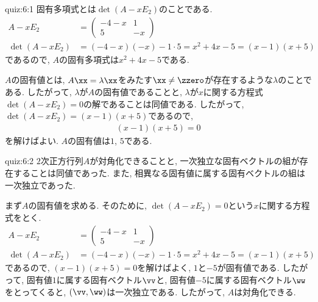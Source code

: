 \begin{answerof}{quiz:6:1}
固有多項式とは$\det(A-xE_2)$のことである.
  \begin{align*}
    A-xE_2&=\begin{pmatrix}-4-x&1\\5&-x\end{pmatrix}\\
    \det(A-xE_2)&=(-4-x)(-x)-1\cdot 5=x^2+4x-5=(x-1)(x+5)
  \end{align*}
  であるので, $A$の固有多項式は$x^2+4x-5$である.

  $A$の固有値とは, $A\xx=\lambda\xx$をみたす$\xx\neq\zzero$が存在するような$\lambda$のことである.
  したがって, $\lambda$が$A$の固有値であることと, 
  $\lambda$が$x$に関する方程式$\det(A-xE_2)=0$の解であることは同値である.
  したがって, $\det(A-xE_2)=(x-1)(x+5)$であるので,
  \begin{align*}
    (x-1)(x+5)=0
  \end{align*}
  を解けばよい.  $A$の固有値は$1$, $5$である.  
\end{answerof}


\begin{answerof}{quiz:6:2}
  $2$次正方行列$A$が対角化できることと,
  一次独立な固有ベクトルの組が存在することは同値であった.
  また, 相異なる固有値に属する固有ベクトルの組は一次独立であった.
  
  まず$A$の固有値を求める.
  そのために, $\det(A-xE_2)=0$という$x$に関する方程式をとく.
  \begin{align*}
    A-xE_2&=\begin{pmatrix}-4-x&1\\5&-x\end{pmatrix}\\
    \det(A-xE_2)&=(-4-x)(-x)-1\cdot 5=x^2+4x-5=(x-1)(x+5)
  \end{align*}
  であるので, $(x-1)(x+5)=0$を解けばよく,
  $1$と$-5$が固有値である.
  したがって,
  固有値$1$に属する固有ベクトル$\vv$と,
  固有値$-5$に属する固有ベクトル$\ww$をとってくると,
  $(\vv,\ww)$は一次独立である.
  したがって, $A$は対角化できる.
\end{answerof}


